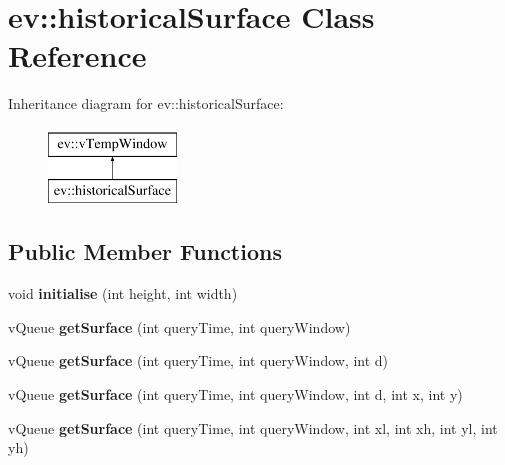 \hypertarget{classev_1_1historicalSurface}{}\section{ev\+:\+:historical\+Surface Class Reference}
\label{classev_1_1historicalSurface}
Inheritance diagram for ev\+:\+:historical\+Surface\+:\begin{figure}[H]
\begin{center}
\leavevmode
\includegraphics[height=2.000000cm]{classev_1_1historicalSurface}
\end{center}
\end{figure}
\subsection*{Public Member Functions}
\begin{DoxyCompactItemize}
\item 
void {\bfseries initialise} (int height, int width)\hypertarget{classev_1_1historicalSurface_adbe662bedcf6ee9c87f9b78d15c8ae85}{}\label{classev_1_1historicalSurface_adbe662bedcf6ee9c87f9b78d15c8ae85}

\item 
v\+Queue {\bfseries get\+Surface} (int query\+Time, int query\+Window)\hypertarget{classev_1_1historicalSurface_a03476e5a9cff0d369fef76711c6ebea5}{}\label{classev_1_1historicalSurface_a03476e5a9cff0d369fef76711c6ebea5}

\item 
v\+Queue {\bfseries get\+Surface} (int query\+Time, int query\+Window, int d)\hypertarget{classev_1_1historicalSurface_a289a2d3cb116fb1cdb99d38b03d74dd0}{}\label{classev_1_1historicalSurface_a289a2d3cb116fb1cdb99d38b03d74dd0}

\item 
v\+Queue {\bfseries get\+Surface} (int query\+Time, int query\+Window, int d, int x, int y)\hypertarget{classev_1_1historicalSurface_a10f0938bac2fc0b7a0f5624dfcd65f2f}{}\label{classev_1_1historicalSurface_a10f0938bac2fc0b7a0f5624dfcd65f2f}

\item 
v\+Queue {\bfseries get\+Surface} (int query\+Time, int query\+Window, int xl, int xh, int yl, int yh)\hypertarget{classev_1_1historicalSurface_a18830cb21753a190270bf03108c95f71}{}\label{classev_1_1historicalSurface_a18830cb21753a190270bf03108c95f71}

\end{DoxyCompactItemize}
